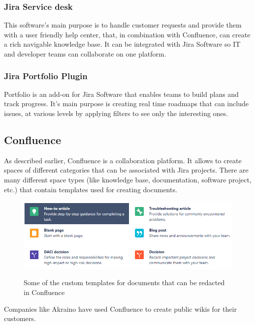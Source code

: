 		\subsubsection{Jira Service desk}\label{subsec:service_desk}
			This software's main purpose is to handle customer requests and provide them with a user friendly help center, that, in combination with Confluence, can create a rich navigable knowledge base.
			It can be integrated with Jira Software so IT and developer teams can collaborate on one platform.

		\subsubsection{Jira Portfolio Plugin}\label{subsec:portfolio}
			Portfolio\cite{portfolio} is an add-on for Jira Software that enables teams to build plans and track progress.
			It's main purpose is creating real time roadmaps that can include issues, at various levels by applying filters to see only the interesting ones. 
		
	\subsection{Confluence}
		As described earlier, Confluence is a collaboration platform.
		It allows to create spaces of different categories that can be associated with Jira projects.
		There are many different space types (like knowledge base, documentation, software project, etc.) that contain templates used for creating documents.
		\begin{figure}[H]
			\centering
			\includegraphics[width=\textwidth]{resources/Annotation2019-07-24180136}\\
			\caption{Some of the custom templates for documents that can be redacted in Confluence}
		\end{figure}
		Companies like Akraino have used Confluence to create public wikis for their customers\cite{akraino}.
		
